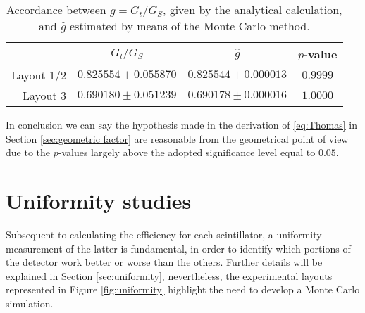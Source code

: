 \begin{table}[!htp]
	\centering
	\begin{tabular}{r|ccc}
		\toprule
		& $G_t/G_S$ & $\hat g$ & $p$-value\\
		\midrule
		Layout 1/2 & $0.825554\pm0.055870$ & $0.825544\pm0.000013$ & $0.9999$\\
		Layout 3 & $0.690180\pm0.051239$ & $0.690178\pm0.000016$ & $1.0000$\\
		\bottomrule
	\end{tabular}
	\caption{Accordance between $g=G_t/G_S$, given by the analytical calculation, and $\hat g$ estimated by means of the Monte Carlo method.}
	\label{tab:G_t}
\end{table}
In conclusion we can say the hypothesis made in the derivation of \eqref{eq:Thomas} in Section \ref{sec:geometric factor} are reasonable from the geometrical point of view due to the $p$-values largely above the adopted significance level equal to $0.05$.



\section{Uniformity studies}

\label{sec:uniformity_studies}

Subsequent to calculating the efficiency for each scintillator, a uniformity measurement of the latter is fundamental, in order to identify which portions of the detector work better or worse than the others. Further details will be explained in Section \ref{sec:uniformity}, nevertheless, the experimental layouts represented in Figure \ref{fig:uniformity} highlight the need to develop a Monte Carlo simulation.\\


